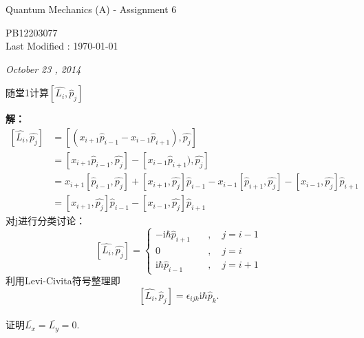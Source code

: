 \documentclass[a4paper]{article}
\begin{document}
    \begin{center}
        \textsf{\LARGE{Quantum Mechanics (A) - Assignment 6}}\\[20pt]
    \end{center}
    \begin{CJK*}{UTF8}{kai}
        \begin{flushright}
            \small PB12203077\\
            \small Last Modified : \today\\[30pt]
        \end{flushright}
    \end{CJK*}
    \begin{CJK*}{UTF8}{song}
    \noindent\Large{\emph{October 23 , 2014}}\\[15pt]
    \begin{CJK*}{UTF8}{kai}
    \noindent 随堂1\quad 计算$[\hat{L_{i}},\hat{p}_{j}]$\\[12pt]
    \end{CJK*}
    {
    \textbf{解：}
    \begin{equation*}
    \begin{split}
    [\hat{L_{i}},\hat{p_{j}}]
        & = [(x_{i+1}\hat{p}_{i-1}-x_{i-1}\hat{p}_{i+1}),\hat{p_{j}}]\\
        & = [x_{i+1}\hat{p}_{i-1},\hat{p_{j}}]-[x_{i-1}\hat{p}_{i+1}),\hat{p_{j}}]\\
        & = x_{i+1}[\hat{p}_{i-1},\hat{p_{j}}]+[x_{i+1},\hat{p_{j}}]\hat{p}_{i-1}
            - x_{i-1}[\hat{p}_{i+1},\hat{p_{j}}] - [x_{i-1},\hat{p_{j}}]\hat{p}_{i+1}\\
        & = [x_{i+1},\hat{p_{j}}]\hat{p}_{i-1} - [x_{i-1},\hat{p_{j}}]\hat{p}_{i+1}
    \end{split}
    \end{equation*}
    对j进行分类讨论：
    \[[\hat{L_{i}},\hat{p_{j}}] =\left\{
    \begin{array}{ll}
        -\mathrm{i}\hbar \hat{p}_{i+1}\quad &,\quad j = i -1\\
        0 \quad & ,\quad j = i \\
        \mathrm{i}\hbar \hat{p}_{i-1} & , \quad j = i + 1
    \end{array}
    \right.
    \]
    利用Levi-Civita符号整理即
    $$[\hat{L_{i}},\hat{p}_{j}] = \epsilon_{ijk}\mathrm{i}\hbar \hat{p}_{k}.$$
    }\\[20pt]
     证明$\overline{L_{x}}=\overline{L_{y}}=0$.\\[8pt]

\end{CJK*}
\end{document}
